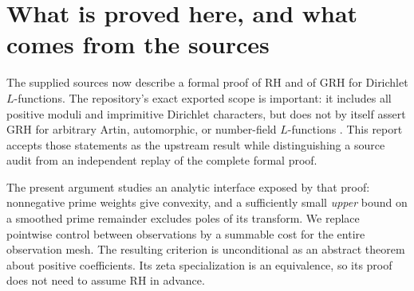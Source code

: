 \documentclass[11pt,a4paper]{article}
\theoremstyle{definition}
\theoremstyle{remark}
\numberwithin{equation}{section}
\newcommand{\Rea}{\operatorname{Re}}
\begin{document}
\begin{abstract}
For nonnegative coefficients \(a_n\), consider
\(R(x)=\sum_{n\leq x}a_n(1/n-1/x)-A\log x-B\), with \(A\geq0\).
At logarithmic sample times \(t_j\), write \(h_j=t_{j+1}-t_j\), and
suppose \(R(e^{t_j})\leq b_j\), where \(b_j\geq0\). We prove that
summability, for every \(\sigma>\beta\), of
\[
 \sum_j e^{(1-\sigma)t_j}
       \bigl[h_j(b_j+b_{j+1})+A h_j^3\bigr]
\]
forces the meromorphic Mellin transform of \(R\) to be holomorphic in
\(\Rea s>\beta\), provided its real poles there are simple with
nonnegative residues. The proof combines exact convex interpolation
with the classical Landau principle. The contribution is the discrete
criterion and its sharpness, not the Landau principle itself.

For the smoothed Mangoldt remainder, this yields an RH-equivalent
positive-part sampling criterion on every admissible mesh. Exact
power grids \(x_j=j^p\) are admissible precisely when
\(p\leq2/(1-\beta)\). At \(\beta=1/2\), geometrically separated holes
of size \(X^{5/6}\) are also admissible. An explicit family of bounded
positive real coefficients has zero readings on a density-one set,
exceptional gaps of size \(X^{(2+\beta)/3}\), and simple poles at
\(\beta+(2m+1)\pi i\), each of residue \(1/140\). Its cubic energy
has abscissa exactly \(\beta\). We also state the corresponding
Dirichlet criterion, allowing the observation grid to depend on the
quadratic twist selected in the upstream proof.
\end{abstract}

\tableofcontents
\newpage

\section{What is proved here, and what comes from the sources}
\label{sec:status}

The supplied sources now describe a formal proof of RH and of GRH for
Dirichlet \(L\)-functions. The repository's exact exported scope is
important: it includes all positive moduli and imprimitive Dirichlet
characters, but does not by itself assert GRH for arbitrary Artin,
automorphic, or number-field \(L\)-functions
\cite{repo,statements,main,wikipedia}. This report accepts those
statements as the upstream result while distinguishing a source audit
from an independent replay of the complete formal proof.

The present argument studies an analytic interface exposed by that
proof: nonnegative prime weights give convexity, and a sufficiently
small \emph{upper} bound on a smoothed prime remainder excludes poles
of its transform. We replace pointwise control between observations
by a summable cost for the entire observation mesh. The resulting
criterion is unconditional as an abstract theorem about positive
coefficients. Its zeta specialization is an equivalence, so its proof
does not need to assume RH in advance.
\end{document}
